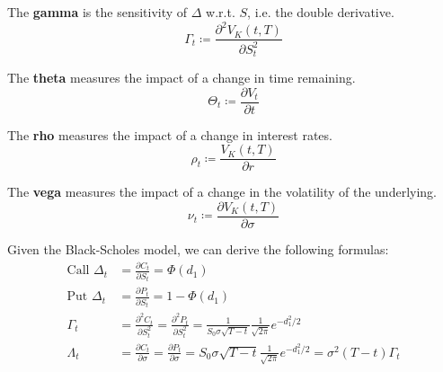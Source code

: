 \documentclass{article}
\begin{document}
  \begin{definition}[Gamma]
    The \textbf{gamma} is the sensitivity of $\Delta$ w.r.t. $S$, i.e. the double derivative. 
    \begin{equation}
      \Gamma_t \coloneqq \frac{\partial^2 V_K (t, T)}{\partial S_t^2}
    \end{equation}
  \end{definition}

  \begin{theorem}
    
  \end{theorem}

  \begin{definition}[Theta]
    The \textbf{theta} measures the impact of a change in time remaining. 
    \begin{equation}
      \Theta_t \coloneqq \frac{\partial V_t}{\partial t}
    \end{equation}
  \end{definition}

  \begin{definition}[Rho]
    The \textbf{rho} measures the impact of a change in interest rates. 
    \begin{equation}
      \rho_t \coloneqq \frac{V_K (t, T)}{\partial r}
    \end{equation}
  \end{definition}

  \begin{definition}[Vega]
    The \textbf{vega} measures the impact of a change in the volatility of the underlying. 
    \begin{equation}
      \nu_t \coloneqq \frac{\partial V_K (t, T)}{\partial \sigma}
    \end{equation}
  \end{definition}

  \begin{theorem}[Properties]
    Given the Black-Scholes model, we can derive the following formulas: 
    \begin{align*}
      \text{Call } \Delta_t & = \frac{\partial C_t}{\partial S_t} = \Phi(d_1) \\
      \text{Put } \Delta_t & = \frac{\partial P_t}{\partial S_t} = 1 - \Phi(d_1) \\
      \Gamma_t & = \frac{\partial^2 C_t}{\partial S_t^2} = \frac{\partial^2 P_t}{\partial S_t^2} = \frac{1}{S_0 \sigma \sqrt{T - t}} \frac{1}{\sqrt{2\pi}} e^{- d_1^2 / 2} \\
      \Lambda_t & = \frac{\partial C_t}{\partial \sigma} = \frac{\partial P_t}{\partial \sigma} = S_0 \sigma \sqrt{T - t} \frac{1}{\sqrt{2\pi}} e^{-d_1^2 / 2} = \sigma^2 (T - t) \Gamma_t 
    \end{align*}
  \end{theorem}
\end{document}
